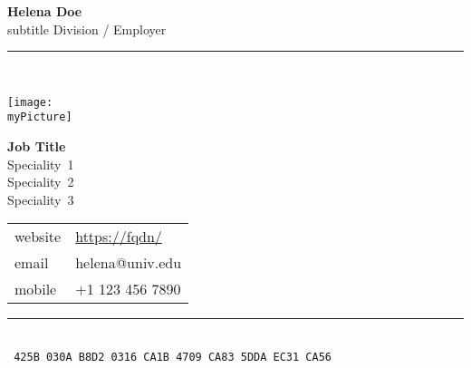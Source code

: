 \documentclass[11pt,a4paper]{memoir}
\makeatletter
\newcommand{\myPicture}{%
avatars-material-woman-4%
}
\newcommand{\myName}{%
Helena Doe%
}
\newcommand{\myEmail}{%
helena@univ.edu%
}
\newcommand{\myPhoneNumber}{%
+1 123 456 7890%
}
\makeatother
\begin{document}
    \begin{Spacing}{1}%
    \noindent
    \textbf{\myName}\\
    \tiny{subtitle}%
    \hfill {\color{gray}
    {%
    \tiny{Division / Employer}%
    }%
    }\\ 
    \rule{\textwidth}{.3mm}\\
    \begin{minipage}[t]{33mm}
        \vspace{-0mm}%
        \texttt{[image: \\myPicture]}
    \end{minipage}
    \hspace{1mm}
    \begin{minipage}[t]{42mm}
        \vspace{-0mm}%
        \begin{flushleft}
        {\scriptsize
            \begin{Spacing}{1}%
            \textbf{Job Title}\\%
            \vspace{1mm}
                \mbox{Speciality 1}\\%
                \mbox{Speciality 2}\\
                \mbox{Speciality 3}
            \vspace{1mm}\\
            \end{Spacing}
        }
\newcommand{\websiteItem}{{}\\}
\def \websiteUrl {https://fqdn/}%
\renewcommand{\websiteItem}{%
    {\color{gray}website} & 
    \href{\websiteUrl{}}
    {\websiteUrl{}}\\
}

        {\tiny
        	\begin{tabular}{ll}
        	\hspace{-2mm}%
            	\websiteItem
            	\hspace{-2mm}%
            	{\color{gray}email} &
            	{\myEmail}\\
            	\hspace{-2mm}%
            	{\color{gray}mobile} &
            	{\myPhoneNumber}\\
            \end{tabular}
            \vspace*{5mm}
        }
        \end{flushleft}
    \end{minipage}
    \rule{74mm}{0mm}\\
    \texttt{\fontsize{2.84mm}{3.55mm}\selectfont
    425B 030A B8D2 0316 CA1B 4709 CA83 5DDA EC31 CA56%
    }
    \end{Spacing}
\end{document}
